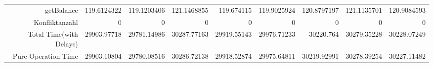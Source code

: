 \begin{landscape}
\begin{table}[htbp]
\begin{tabular}{rrrrrrrrr}
    getBalance & 119.6124322 & 119.1203406 & 121.1468855 & 119.674115 & 119.9025924 & 120.8797197 & 121.1135701 & 120.9084593 \\
    Konfliktanzahl & 0     & 0     & 0     & 0     & 0     & 0     & 0     & 0 \\
    Total Time(with Delays) & 29903.97718 & 29781.14986 & 30287.77163 & 29919.55143 & 29976.71233 & 30220.764 & 30279.35228 & 30228.07249 \\
    Pure Operation Time & 29903.10804 & 29780.08516 & 30286.72138 & 29918.52874 & 29975.64811 & 30219.92991 & 30278.39254 & 30227.11482 \\
    \bottomrule
    \end{tabular}%
  \label{tab:addlabel}%
\end{table}%
\end{landscape}





